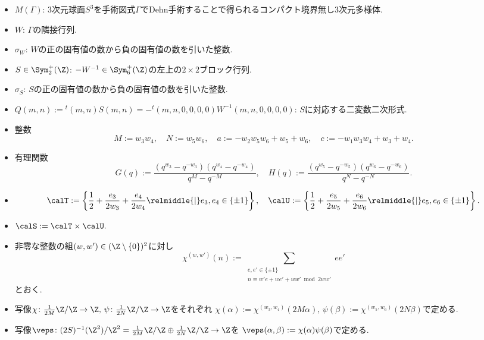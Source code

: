 \documentclass[11pt,b5paper,oneside,lualatex]{ltjsarticle} %
\numberwithin{equation}{section} %
\begin{document}
\begin{dfn}
	\begin{itemize}
		\item $ M(\Gamma) $: $ 3 $次元球面$ S^3 $を手術図式$ \Gamma $でDehn手術することで得られるコンパクト境界無し$ 3 $次元多様体.
		\item $ W $: $ \Gamma $の隣接行列.
		\item $ \sigma_W $: $ W $の正の固有値の数から負の固有値の数を引いた整数.
		\item $ S \in \Sym_2^+(\Z) $: $ -W^{-1} \in \Sym_6^+(\Z) $の左上の$ 2 \times 2 $ブロック行列.
		\item $ \sigma_S $: $ S $の正の固有値の数から負の固有値の数を引いた整数.
		\item $ Q(m, n) := {}^t\!(m, n) S (m, n) = -{}^t\!(m, n, 0, 0, 0, 0) W^{-1} (m, n, 0, 0, 0, 0) $: $ S $に対応する二変数二次形式.
		\item 整数
		\[
		M := w_3 w_4, \quad
		N := w_5 w_6, \quad
		a := -w_2 w_5 w_6 + w_5 + w_6, \quad
		c := -w_1 w_3 w_4 + w_3 + w_4.
		\]
		\item 
		有理関数
		\[
		G(q) := \frac{(q^{w_3} - q^{-w_3})(q^{w_4} - q^{-w_4})}{q^{M} - q^{-M}}, \quad
		H(q) := \frac{(q^{w_5} - q^{-w_5})(q^{w_6} - q^{-w_6})}{q^{N} - q^{-N}}.
		\]
		\item 
		\[
		\calT := \left\{ \frac{1}{2} + \frac{e_3}{2w_3} + \frac{e_4}{2w_4} \relmiddle{|} e_3, e_4 \in \{ \pm 1 \} \right\}, \quad
		\calU := \left\{ \frac{1}{2} + \frac{e_5}{2w_5} + \frac{e_6}{2w_6} \relmiddle{|} e_5, e_6 \in \{ \pm 1 \} \right\}.
		\]
		\item $ \calS := \calT \times \calU. $
		\item 非零な整数の組$ (w, w') \in (\Z \setminus \{ 0 \})^2 $に対し
		\[
		\chi^{(w, w')}(n) := 
		\sum_{\substack{
			e, e' \in \{ \pm 1 \} \\
			n \equiv w'e + we' +ww' \bmod 2ww'
		}}
		ee'
		\]
		とおく.
		\item 写像$ \chi \colon \frac{1}{2M}\Z/\Z \to \Z, \, \psi \colon \frac{1}{2N}\Z/\Z \to \Z $をそれぞれ
		$ \chi(\alpha) := \chi^{(w_3, w_4)}(2M\alpha), \, \psi(\beta) := \chi^{(w_5, w_6)}(2N\beta) $で定める. 
		\item 写像$ \veps \colon (2S)^{-1}(\Z^2)/\Z^2 = \frac{1}{2M}\Z/\Z \oplus \frac{1}{2N}\Z/\Z \to \Z $を
		$ \veps(\alpha, \beta) := \chi(\alpha) \psi(\beta) $で定める.
	\end{itemize}
\end{dfn}
\end{document}
